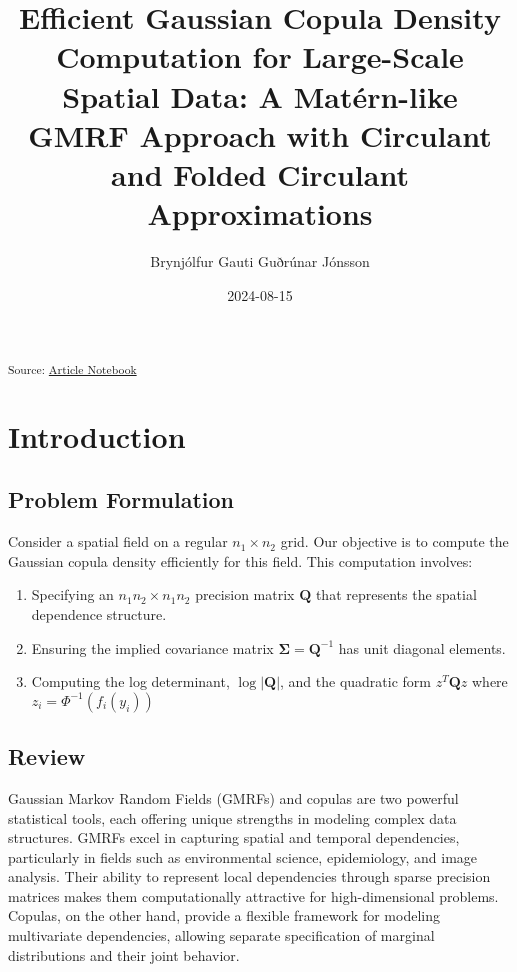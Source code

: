 \documentclass[
  letterpaper,
  DIV=11,
  numbers=noendperiod]{scrartcl}
\title{Efficient Gaussian Copula Density Computation for Large-Scale
Spatial Data: A Matérn-like GMRF Approach with Circulant and Folded
Circulant Approximations}
\author{Brynjólfur Gauti Guðrúnar Jónsson}
\date{2024-08-15}
\providecommand{\tightlist}{%
  \setlength{\itemsep}{0pt}\setlength{\parskip}{0pt}}\usepackage{longtable,booktabs,array}
\begin{document}
\maketitle


\textsubscript{Source:
\href{https://bgautijonsson.github.io/MaternEigenPaper/index.qmd.html}{Article
Notebook}}

\section{Introduction}\label{introduction}

\subsection{Problem Formulation}\label{problem-formulation}

Consider a spatial field on a regular \(n_1 \times n_2\) grid. Our
objective is to compute the Gaussian copula density efficiently for this
field. This computation involves:

\begin{enumerate}
\def\labelenumi{\arabic{enumi}.}
\tightlist
\item
  Specifying an \(n_1 n_2 \times n_1 n_2\) precision matrix
  \(\mathbf{Q}\) that represents the spatial dependence structure.
\item
  Ensuring the implied covariance matrix
  \(\mathbf{\Sigma} = \mathbf{Q}^{-1}\) has unit diagonal elements.
\item
  Computing the log determinant, \(\log |\mathbf Q|\), and the quadratic
  form \(z^T \mathbf Q z\) where \(z_i = \Phi^{-1}(f_i(y_i))\)
\end{enumerate}

\subsection{Review}\label{review}

Gaussian Markov Random Fields (GMRFs) and copulas are two powerful
statistical tools, each offering unique strengths in modeling complex
data structures. GMRFs excel in capturing spatial and temporal
dependencies, particularly in fields such as environmental science,
epidemiology, and image analysis. Their ability to represent local
dependencies through sparse precision matrices makes them
computationally attractive for high-dimensional problems. Copulas, on
the other hand, provide a flexible framework for modeling multivariate
dependencies, allowing separate specification of marginal distributions
and their joint behavior.
\end{document}
